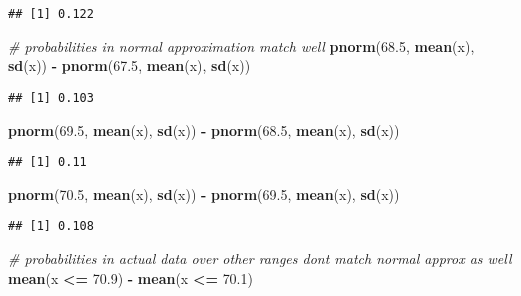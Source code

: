 \documentclass[
]{article}
\newenvironment{Shaded}{\begin{snugshade}}{\end{snugshade}}
\newcommand{\CommentTok}[1]{\textcolor[rgb]{0.56,0.35,0.01}{\textit{#1}}}
\newcommand{\FloatTok}[1]{\textcolor[rgb]{0.00,0.00,0.81}{#1}}
\newcommand{\KeywordTok}[1]{\textcolor[rgb]{0.13,0.29,0.53}{\textbf{#1}}}
\newcommand{\NormalTok}[1]{#1}
\newcommand{\OperatorTok}[1]{\textcolor[rgb]{0.81,0.36,0.00}{\textbf{#1}}}
\newcommand{\StringTok}[1]{\textcolor[rgb]{0.31,0.60,0.02}{#1}}
\begin{document}
\begin{verbatim}
## [1] 0.122
\end{verbatim}

\begin{Shaded}
\begin{Highlighting}[]
\CommentTok{\# probabilities in normal approximation match well}
\KeywordTok{pnorm}\NormalTok{(}\FloatTok{68.5}\NormalTok{, }\KeywordTok{mean}\NormalTok{(x), }\KeywordTok{sd}\NormalTok{(x)) }\OperatorTok{{-}}\StringTok{ }\KeywordTok{pnorm}\NormalTok{(}\FloatTok{67.5}\NormalTok{, }\KeywordTok{mean}\NormalTok{(x), }\KeywordTok{sd}\NormalTok{(x))}
\end{Highlighting}
\end{Shaded}

\begin{verbatim}
## [1] 0.103
\end{verbatim}

\begin{Shaded}
\begin{Highlighting}[]
\KeywordTok{pnorm}\NormalTok{(}\FloatTok{69.5}\NormalTok{, }\KeywordTok{mean}\NormalTok{(x), }\KeywordTok{sd}\NormalTok{(x)) }\OperatorTok{{-}}\StringTok{ }\KeywordTok{pnorm}\NormalTok{(}\FloatTok{68.5}\NormalTok{, }\KeywordTok{mean}\NormalTok{(x), }\KeywordTok{sd}\NormalTok{(x))}
\end{Highlighting}
\end{Shaded}

\begin{verbatim}
## [1] 0.11
\end{verbatim}

\begin{Shaded}
\begin{Highlighting}[]
\KeywordTok{pnorm}\NormalTok{(}\FloatTok{70.5}\NormalTok{, }\KeywordTok{mean}\NormalTok{(x), }\KeywordTok{sd}\NormalTok{(x)) }\OperatorTok{{-}}\StringTok{ }\KeywordTok{pnorm}\NormalTok{(}\FloatTok{69.5}\NormalTok{, }\KeywordTok{mean}\NormalTok{(x), }\KeywordTok{sd}\NormalTok{(x))}
\end{Highlighting}
\end{Shaded}

\begin{verbatim}
## [1] 0.108
\end{verbatim}

\begin{Shaded}
\begin{Highlighting}[]
\CommentTok{\# probabilities in actual data over other ranges don\textquotesingle{}t match normal approx as well}
\KeywordTok{mean}\NormalTok{(x }\OperatorTok{\textless{}=}\StringTok{ }\FloatTok{70.9}\NormalTok{) }\OperatorTok{{-}}\StringTok{ }\KeywordTok{mean}\NormalTok{(x }\OperatorTok{\textless{}=}\StringTok{ }\FloatTok{70.1}\NormalTok{)}
\end{Highlighting}
\end{Shaded}
\end{document}
